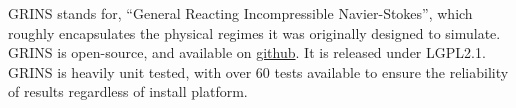 GRINS stands for, ``General Reacting Incompressible Navier-Stokes'',
which roughly encapsulates the physical regimes it was originally
designed to simulate. GRINS is open-source, and available on
\hyperref[www.github.com/grinsfem/grins]{github}. It is released 
under LGPL2.1.  GRINS is heavily unit tested, with over 60 tests
available to ensure the reliability of results regardless of install
platform. 






%
%









